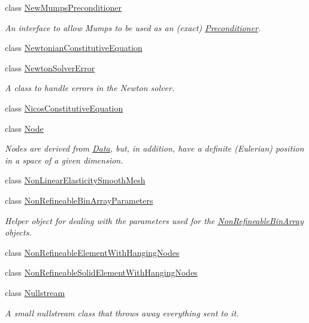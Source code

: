 \begin{DoxyCompactItemize}
class \hyperlink{classoomph_1_1NewMumpsPreconditioner}{New\+Mumps\+Preconditioner}
\begin{DoxyCompactList}\small\item\em An interface to allow Mumps to be used as an (exact) \hyperlink{classoomph_1_1Preconditioner}{Preconditioner}. \end{DoxyCompactList}\item 
class \hyperlink{classoomph_1_1NewtonianConstitutiveEquation}{Newtonian\+Constitutive\+Equation}
\item 
class \hyperlink{classoomph_1_1NewtonSolverError}{Newton\+Solver\+Error}
\begin{DoxyCompactList}\small\item\em A class to handle errors in the Newton solver. \end{DoxyCompactList}\item 
class \hyperlink{classoomph_1_1NicosConstitutiveEquation}{Nicos\+Constitutive\+Equation}
\item 
class \hyperlink{classoomph_1_1Node}{Node}
\begin{DoxyCompactList}\small\item\em Nodes are derived from \hyperlink{classoomph_1_1Data}{Data}, but, in addition, have a definite (Eulerian) position in a space of a given dimension. \end{DoxyCompactList}\item 
class \hyperlink{classoomph_1_1NonLinearElasticitySmoothMesh}{Non\+Linear\+Elasticity\+Smooth\+Mesh}
\item 
class \hyperlink{classoomph_1_1NonRefineableBinArrayParameters}{Non\+Refineable\+Bin\+Array\+Parameters}
\begin{DoxyCompactList}\small\item\em Helper object for dealing with the parameters used for the \hyperlink{classNonRefineableBinArray}{Non\+Refineable\+Bin\+Array} objects. \end{DoxyCompactList}\item 
class \hyperlink{classoomph_1_1NonRefineableElementWithHangingNodes}{Non\+Refineable\+Element\+With\+Hanging\+Nodes}
\item 
class \hyperlink{classoomph_1_1NonRefineableSolidElementWithHangingNodes}{Non\+Refineable\+Solid\+Element\+With\+Hanging\+Nodes}
\item 
class \hyperlink{classoomph_1_1Nullstream}{Nullstream}
\begin{DoxyCompactList}\small\item\em A small nullstream class that throws away everything sent to it. \end{DoxyCompactList}\item 

\end{DoxyCompactItemize}
